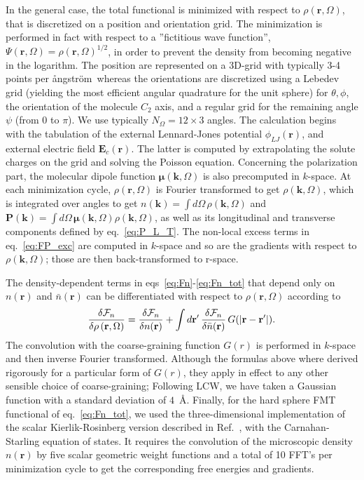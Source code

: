 \documentclass[aip,jcp,showpacs,amsmath,amssymb,superscriptaddress]{revtex4-1}
\newcommand{\rr}{\mathbf{r}}
\newcommand{\kk}{\mathbf{k}}
\newcommand{\rhorom}{{\rho\left({\mathbf r},\Omega\right)}}
\newcommand{\F}{{\cal F}}
\newcommand{\MU}{\boldsymbol{\mu}}
\newcommand{\rhonbar}{\bar{n}({\mathbf r})}
\newcommand{\PP}{\mathbf{P}}
\newcommand{\EE}{\mathbf{E}}
\newcommand{\angstrom}{\r{a}ngstr\"{o}m}
\begin{document}
In the general case, the total functional  is minimized with respect to $\rhorom$, that is discretized  on a  position and orientation grid.  The minimization is performed in fact with respect to a ''fictitious wave function'', $\Psi(\rr,\Omega)=\rho(\rr,\Omega)^{1/2}$,  in order to prevent the density from becoming negative in the logarithm. The position are represented on a 3D-grid with typically 3-4  points per \angstrom \ whereas the orientations are discretized using a Lebedev grid (yielding the most efficient angular quadrature for the unit sphere\cite{lebedev99}) for $\theta, \phi$, the orientation of the molecule $C_{2}$ axis, and a regular grid for the remaining angle $\psi$ (from $0$ to $\pi$). We use typically $N_\Omega = 12 \times 3$ angles. The calculation begins with the tabulation of the external Lennard-Jones potential $\phi_{LJ}(\rr)$, and external electric field $\EE_c(\rr)$. The latter is computed by extrapolating the solute charges on the grid and solving the Poisson equation. Concerning the polarization part, the molecular dipole function $\MU(\kk,\Omega)$ is also precomputed in $k$-space.   At each minimization cycle, $\rhorom$ is Fourier transformed to get 
$\rho(\kk,\Omega)$,  which is integrated over angles to get $n(\kk)=\int d\Omega \, \rho(\kk,\Omega)$ and $\PP(\kk) = \int d\Omega \, \MU(\kk,\Omega) \rho(\kk,\Omega)$,  as well as  its longitudinal and transverse components defined by eq.~\ref{eq:P_L_T}.
The non-local excess terms in eq.~\ref{eq:FP_exc} are computed in $k$-space and so are the gradients with respect to $\rho(\kk,\Omega)$; those are then back-transformed to r-space. 

The density-dependent terms in eqs~\ref{eq:Fn}-\ref{eq:Fn_tot}  that depend only on $n(\rr)$ and 
$\rhonbar$ can be differentiated with respect to $\rhorom$ according to 
\begin{equation}
    \frac{\delta \F_n}{\delta \rhorom} =  \frac{\delta \F_n}{\delta n(\rr)} + \int d\rr' \, \frac{\delta \F_n}{\delta \rhonbar} \, G(|\rr - \rr'|).
\end{equation}
The convolution with the coarse-graining function $G(r)$  is performed in $k$-space and then inverse Fourier transformed. Although the formulas above where derived rigorously for a particular form of $G(r)$, they apply in effect to any other sensible choice of coarse-graining; Following LCW\cite{lum99}, we have taken a Gaussian function with a standard deviation of $4$~\AA.  Finally, for the hard sphere FMT functional of eq.~\ref{eq:Fn_tot}, we used the three-dimensional implementation of the scalar Kierlik-Rosinberg version described in Ref.~, with the Carnahan-Starling equation of states. It requires the convolution of the microscopic density $n(\rr)$ by five scalar geometric  weight functions and a total of 10 FFT's per minimization cycle to get the corresponding free energies and gradients. 
\end{document}
